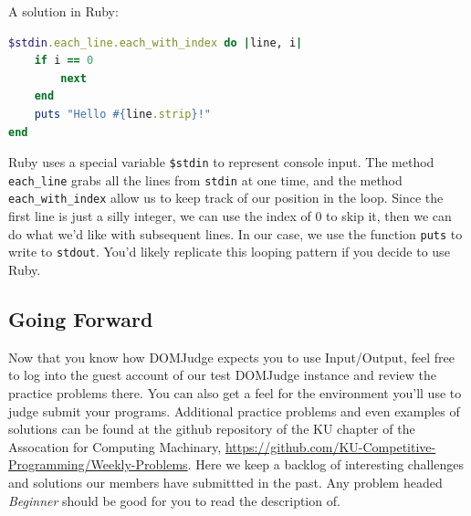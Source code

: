 \documentclass[a4paper]{article}
\begin{document}
A solution in Ruby:
\begin{lstlisting}[language=Ruby]
$stdin.each_line.each_with_index do |line, i|
    if i == 0
        next
    end
    puts "Hello #{line.strip}!"
end
\end{lstlisting}

Ruby uses a special variable \texttt{\$stdin} to represent console input. The method \texttt{each\_line} grabs all the lines from \texttt{stdin} at one time, and the method \texttt{each\_with\_index} allow us to keep track of our position in the loop. Since the first line is just a silly integer, we can use the index of 0 to skip it, then we can do what we'd like with subsequent lines. In our case, we use the function \texttt{puts} to write to \texttt{stdout}. You'd likely replicate this looping pattern if you decide to use Ruby.

\subsection{Going Forward}
Now that you know how DOMJudge expects you to use Input/Output, feel free to log into the guest account of our test DOMJudge instance and review the practice problems there. You can also get a feel for the environment you'll use to judge submit your programs. Additional practice problems and even examples of solutions can be found at the github repository of the KU chapter of the Assocation for Computing Machinary, \url{https://github.com/KU-Competitive-Programming/Weekly-Problems}. Here we keep a backlog of interesting challenges and solutions our members have submittted in the past. Any problem headed \textit{Beginner} should be good for you to read the description of. 
\end{document}
